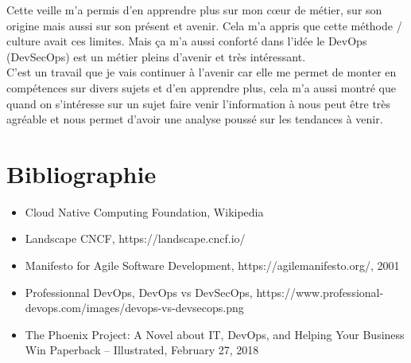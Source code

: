 \documentclass[11pt,a4paper,oneside]{book}
\begin{document}
Cette veille m'a permis d'en apprendre plus sur mon cœur de métier, sur son origine mais aussi sur son présent et avenir. Cela m'a appris que cette méthode / culture avait ces limites. Mais ça m'a aussi conforté dans l'idée le DevOps (DevSecOps) est un métier pleins d'avenir et très intéressant. \\

C'est un travail que je vais continuer à l'avenir car elle me permet de monter en compétences sur divers sujets et d'en apprendre plus, cela m'a aussi montré que quand on s'intéresse sur un sujet faire venir l'information à nous peut être très agréable et nous permet d'avoir une analyse poussé sur les tendances à venir.



\chapter{Bibliographie}

\begin{itemize}
\item Cloud Native Computing Foundation, Wikipedia
\item Landscape CNCF, https://landscape.cncf.io/
\item Manifesto for Agile Software Development, https://agilemanifesto.org/, 2001
\item Professionnal DevOps, DevOps vs DevSecOps, https://www.professional-devops.com/images/devops-vs-devsecops.png
\item The Phoenix Project: A Novel about IT, DevOps, and Helping Your Business Win Paperback – Illustrated, February 27, 2018
\end{itemize}



\newpage

\listoffigures
\end{document}
